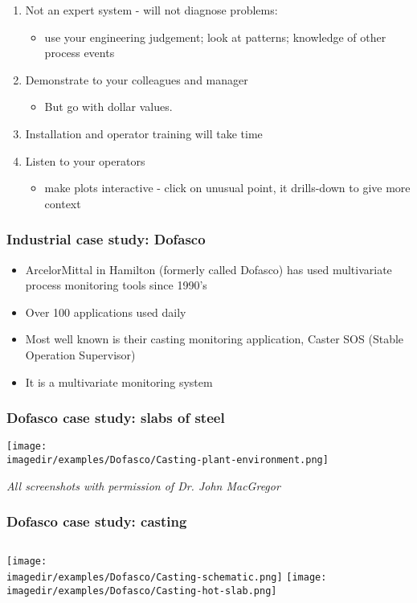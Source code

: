 \begin{frame}[allowframebreaks]
\begin{enumerate}
\begin{itemize}
		\end{itemize}
		\item	Not an expert system - will not diagnose problems:
		\begin{itemize}
			\item	use your engineering judgement; look at patterns; knowledge of other process events
		\end{itemize}
		\item	Demonstrate to your colleagues and manager
		\begin{itemize}
			\item	But go with dollar values.
		\end{itemize}
		\item	Installation and operator training will take time
		\item	Listen to your operators
		\begin{itemize}
			\item	make plots interactive - click on unusual point, it drills-down to give more context
		\end{itemize}
	\end{enumerate}
\end{frame}

\begin{frame}\frametitle{Industrial case study: Dofasco}
	\begin{itemize}
		\item	ArcelorMittal in Hamilton (formerly called Dofasco) has used multivariate process monitoring tools since 1990's
		\item	Over 100 applications used daily
		\item	Most well known is their casting monitoring application, Caster SOS (Stable Operation Supervisor)
		\item	It is a multivariate monitoring system
	\end{itemize}
\end{frame}

\begin{frame}\frametitle{Dofasco case study: slabs of steel}

	\texttt{[image: \\imagedir/examples/Dofasco/Casting-plant-environment.png]}

	\emph{All screenshots with permission of Dr. John MacGregor}
\end{frame}

\begin{frame}\frametitle{Dofasco case study: casting}
	\begin{columns}
		\column{5cm}
		\texttt{[image: \\imagedir/examples/Dofasco/Casting-schematic.png]} \column{5cm}
		\texttt{[image: \\imagedir/examples/Dofasco/Casting-hot-slab.png]}
	\end{columns}
\end{frame}

